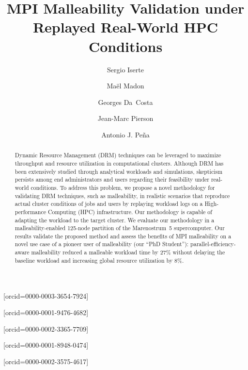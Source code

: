 \documentclass[a4paper,fleqn]{cas-dc}
\begin{document}
\let\WriteBookmarks\relax
\def\floatpagepagefraction{1}
\def\textpagefraction{.001}



\title [mode = title]{MPI Malleability Validation under Replayed Real-World HPC Conditions}


\author[1]{Sergio Iserte}[orcid=0000-0003-3654-7924]
\cormark[1]

\author[2]{Maël Madon}[orcid=0000-0001-9476-4682]
\author[2]{Georges Da~Costa}[orcid=0000-0002-3365-7709]
\author[2]{Jean-Marc Pierson}[orcid=0000-0001-8948-0474]
\author[1]{Antonio J. Peña}[orcid=0000-0002-3575-4617]

            




\begin{abstract}
Dynamic Resource Management (DRM) techniques can be leveraged to maximize throughput and resource utilization in computational clusters.
Although DRM has been extensively studied through analytical workloads and simulations, skepticism persists among end administrators and users regarding their feasibility under real-world conditions.
To address this problem, we propose a novel methodology for validating DRM techniques, such as malleability, in realistic scenarios that reproduce actual cluster conditions of jobs and users by replaying workload logs on a High-performance Computing (HPC) infrastructure.
Our methodology is capable of adapting the workload to the target cluster.
We evaluate our methodology in a malleability-enabled 125-node partition of the Marenostrum~5 supercomputer. Our results validate the proposed method and assess the benefits of MPI malleability on a novel use case of a pioneer user of malleability (our ``PhD Student''): parallel-efficiency-aware malleability reduced a malleable workload time by 27\% without delaying the baseline workload and increasing global resource utilization by 8\%.
\end{abstract}
\end{document}
